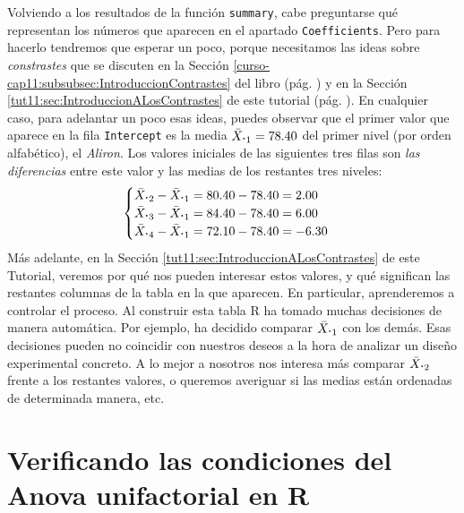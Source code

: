 \documentclass[10pt,a4paper]{article}\usepackage[]{graphicx}\usepackage[]{color}
\newcounter {cont01}
\begin{document}
Volviendo a los resultados de la función {\tt summary}, cabe preguntarse qué representan los números que aparecen en el apartado {\tt Coefficients}. Pero para hacerlo tendremos que esperar un poco, porque necesitamos las ideas sobre {\em constrastes} que se discuten en la Sección \ref{curso-cap11:subsubsec:IntroduccionContrastes} del libro (pág. \pageref{curso-cap11:subsubsec:IntroduccionContrastes}) y en la Sección \ref{tut11:sec:IntroduccionALosContrastes} de este tutorial (pág. \pageref{tut11:sec:IntroduccionALosContrastes}). En cualquier caso, para adelantar un poco esas ideas, puedes observar que el primer valor que aparece en la fila {\tt Intercept} es la media $\bar X_{{\mbox{\bf\large$\cdot$}}1}=78.40$ del primer nivel (por orden alfabético), el {\em Aliron}. Los valores iniciales de las siguientes tres filas son {\em las diferencias} entre este valor y las medias de los restantes tres niveles:
\[
\begin{cases}
\bar X_{{\mbox{\bf\large$\cdot$}}2} - \bar X_{{\mbox{\bf\large$\cdot$}}1} =  80.40 - 78.40 = 2.00\\
\bar X_{{\mbox{\bf\large$\cdot$}}3} - \bar X_{{\mbox{\bf\large$\cdot$}}1} =  84.40 - 78.40 = 6.00\\
\bar X_{{\mbox{\bf\large$\cdot$}}4} - \bar X_{{\mbox{\bf\large$\cdot$}}1} =  72.10 - 78.40 = -6.30\\
\end{cases}
\]
Más adelante, en la Sección \ref{tut11:sec:IntroduccionALosContrastes} de este Tutorial, veremos por qué nos pueden interesar estos valores, y qué significan las restantes columnas de la tabla en la que aparecen. En particular, aprenderemos a controlar el proceso. Al construir esta tabla R ha tomado muchas decisiones de manera automática. Por ejemplo, ha decidido comparar $\bar X_{{\mbox{\bf\large$\cdot$}}1}$ con los demás. Esas decisiones pueden no coincidir con nuestros deseos a la hora de analizar un diseño experimental concreto. A lo mejor a nosotros nos interesa más comparar $\bar X_{{\mbox{\bf\large$\cdot$}}2}$ frente a los restantes valores, o queremos averiguar  si las medias están ordenadas de determinada manera, etc.


\section{Verificando las condiciones del Anova unifactorial en R}
\label{tut11:sec:VerificandoCondicionesAnovaR}
\end{document}
